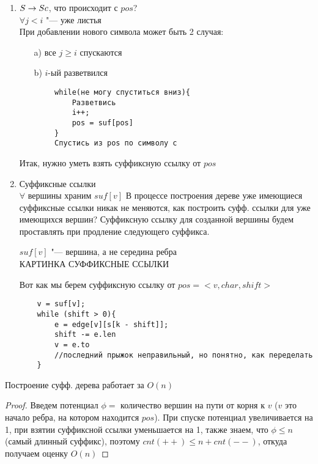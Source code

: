 \begin{enumerate}
\begin{proof}
		КАРТИНКА ДОКАЗАТЕЛЬСТВА ЛЕММЫ
	\end{proof}
	Таким образом, надо поддерживать самый длинный неразретвившийся суффикс, будем хранить его в переменной $pos$, как комбинацию вершины дерева, символа по которому надо пойти и сдвига на ребре ($pos$ может быть на середине ребра), $i$ "--- позиция начала суффикса
\item
	$ S \rightarrow Sc $, что происходит с $pos$? \\
	$\forall j < i$ "--- уже листья \\
	При добавлении нового символа может быть 2 случая:
	\begin{itemize}
	\item[a)]
		все $j \geqslant i$ спускаются
	\item[b)]
		$i$-ый разветвился
	\end{itemize}
	\begin{verbatim}
		while(не могу спуститься вниз){
			Разветвись
			i++;
			pos = suf[pos]
		}
		Спустись из pos по символу c
	\end{verbatim}
	Итак, нужно уметь взять суффиксную ссылку от $pos$
\item
	Суффиксные ссылки \\
	$\forall$ вершины храним $suf[v]$
	В процессе построения дереве уже имеющиеся суффиксные ссылки никак не меняются, как построить суфф. ссылки для уже имеющихся вершин? Суффиксную ссылку для созданной вершины будем проставлять при продление следующего суффикса.
	\begin{lemma}
		$suf[v]$ "--- вершина, а не середина ребра \\
		КАРТИНКА СУФФИКСНЫЕ ССЫЛКИ
	\end{lemma}
	Вот как мы берем суффиксную ссылку от $pos = < v, char, shift >$
	\begin{verbatim}
	v = suf[v];
	while (shift > 0){
		e = edge[v][s[k - shift]];
		shift -= e.len
		v = e.to
		//последний прыжок неправильный, но понятно, как переделать
	}
	\end{verbatim}
\end{enumerate}

\begin{theorem}
	Построение суфф. дерева работает за $O(n)$
\end{theorem}
\begin{proof}
	Введем потенциал $\phi =$ количество вершин на пути от корня к $v$ ($v$ это начало ребра, на котором находится $pos$). При спуске потенциал увеличивается на 1, при взятии суффиксной ссылки уменьшается на 1, также знаем, что $\phi \leqslant n$ (самый длинный суффикс), поэтому $cnt(++) \leqslant n + cnt(--)$, откуда получаем оценку $O(n)$
\end{proof}

